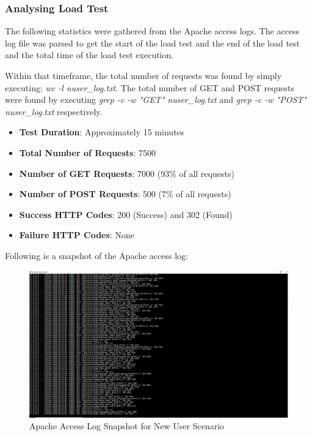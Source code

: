 \documentclass[fontsize=12pt,paper=letter,twoside]{scrartcl}
\begin{document}
\subsubsection{Analysing Load Test}
The following statistics were gathered from the Apache access logs. The access log file was parsed to get the start of the load test and the end of the load test and the total time of the load test execution.

\bigskip
\noindent Within that timeframe, the total number of requests was found by simply executing: \emph{wc -l nuser\_log.txt}. The total number of GET and POST requests were found by executing \emph{grep -c -w "GET" nuser\_log.txt} and \emph{grep -c -w "POST" nuser\_log.txt} respectively.

\begin{itemize}
\item \textbf{Test Duration}: Approximately 15 minutes
\item \textbf{Total Number of Requests}: 7500
\item \textbf{Number of GET Requests}: 7000 (93\% of all requests)
\item \textbf{Number of POST Requests}: 500 (7\% of all requests)
\item \textbf{Success HTTP Codes}: 200 (Success) and 302 (Found)
\item \textbf{Failure HTTP Codes}: None
\end{itemize}

\bigskip
\noindent Following is a snapshot of the Apache access log:
\begin{figure}[!htb]
\begin{center}
\includegraphics[width=.8\textwidth]{../../load-test/test-plans/new-user/access-log.png}
\end{center}
\caption{Apache Access Log Snapshot for New User Scenario}
\label{fig:nuser:access_log}
\end{figure}
\end{document}
